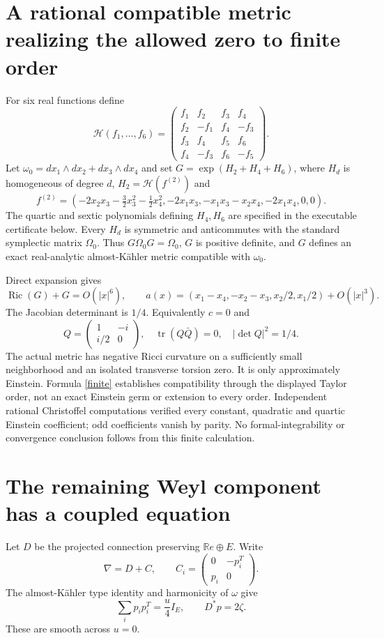 \documentclass[11pt]{article}
\newcommand{\Ric}{\operatorname{Ric}}
\newcommand{\tr}{\operatorname{tr}}
\begin{document}
\section{A rational compatible metric realizing the allowed zero to finite order}
For six real functions define
\[
\mathcal H(f_1,\ldots,f_6)=
\begin{pmatrix}
f_1&f_2&f_3&f_4\\f_2&-f_1&f_4&-f_3\\
f_3&f_4&f_5&f_6\\f_4&-f_3&f_6&-f_5
\end{pmatrix}.
\]
Let $\omega_0=dx_1\wedge dx_2+dx_3\wedge dx_4$ and set $G=\exp(H_2+H_4+H_6)$, where $H_d$ is homogeneous of degree $d$, $H_2=\mathcal H(f^{(2)})$ and
\[
f^{(2)}=\left(-2x_2x_3-\tfrac32x_3^2-\tfrac12x_4^2,
-2x_1x_3,-x_1x_3-x_2x_4,-2x_1x_4,0,0\right).
\]
The quartic and sextic polynomials defining $H_4,H_6$ are specified in the executable certificate below. Every $H_d$ is symmetric and anticommutes with the standard symplectic matrix $\Omega_0$. Thus $G\Omega_0G=\Omega_0$, $G$ is positive definite, and $G$ defines an exact real-analytic almost-K\"ahler metric compatible with $\omega_0$.

Direct expansion gives
\begin{equation}\label{finite}
\Ric(G)+G=O(|x|^6),\qquad
 a(x)=(x_1-x_4,-x_2-x_3,x_2/2,x_1/2)+O(|x|^3).
\end{equation}
The Jacobian determinant is $1/4$. Equivalently $c=0$ and
\[
Q=\begin{pmatrix}1&-i\\ i/2&0\end{pmatrix},\quad
\tr(Q\bar Q)=0,\quad |\det Q|^2=1/4.
\]
The actual metric has negative Ricci curvature on a sufficiently small neighborhood and an isolated transverse torsion zero. It is only approximately Einstein. Formula \eqref{finite} establishes compatibility through the displayed Taylor order, not an exact Einstein germ or extension to every order. Independent rational Christoffel computations verified every constant, quadratic and quartic Einstein coefficient; odd coefficients vanish by parity. No formal-integrability or convergence conclusion follows from this finite calculation.

\section{The remaining Weyl component has a coupled equation}
Let $D$ be the projected connection preserving $\mathbb Re\oplus E$. Write
\[
\nabla=D+C,\qquad
C_i=\begin{pmatrix}0&-p_i^T\\p_i&0\end{pmatrix}.
\]
The almost-K\"ahler type identity and harmonicity of $\omega$ give
\begin{equation}\label{ptype}
\sum_i p_ip_i^T=\frac u4 I_E,\qquad D^*p=2\zeta.
\end{equation}
These are smooth across $u=0$.
\end{document}
